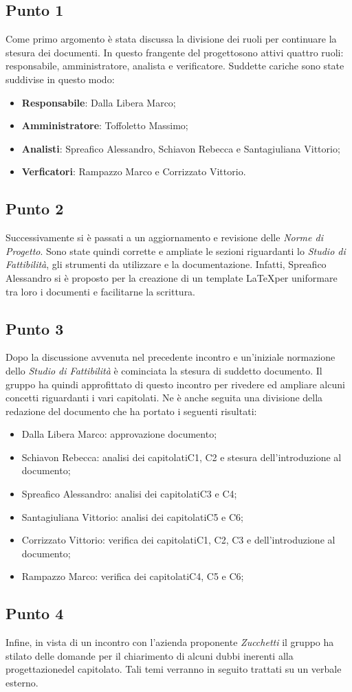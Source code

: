     \subsection{Punto 1}
        Come primo argomento è stata discussa la divisione dei ruoli per continuare la stesura dei documenti. In questo frangente del progetto\glosp sono attivi quattro ruoli: responsabile, amministratore, analista e verificatore. Suddette cariche sono state suddivise in questo modo:
        \begin{itemize}
            \item \textbf{Responsabile}: Dalla Libera Marco;
            \item \textbf{Amministratore}: Toffoletto Massimo;
            \item \textbf{Analisti}: Spreafico Alessandro, Schiavon Rebecca e Santagiuliana Vittorio;
            \item \textbf{Verficatori}: Rampazzo Marco e Corrizzato Vittorio. 
        \end{itemize}
    \subsection{Punto 2}
        Successivamente si è passati a un aggiornamento e revisione delle \textit{Norme di Progetto}. Sono state quindi corrette e ampliate le sezioni riguardanti lo \textit{Studio di Fattibilità}, gli strumenti da utilizzare e la documentazione. Infatti, Spreafico Alessandro si è proposto per la creazione di un template \LaTeX per uniformare tra loro i documenti e facilitarne la scrittura.
    \subsection{Punto 3}
        Dopo la discussione avvenuta nel precedente incontro e un'iniziale normazione dello \textit{Studio di Fattibilità} è cominciata la stesura di suddetto documento. Il gruppo ha quindi approfittato di questo incontro per rivedere ed ampliare alcuni concetti riguardanti i vari capitolati\glo. Ne è anche seguita una divisione della redazione del documento che ha portato i seguenti risultati:
        \begin{itemize}
            \item Dalla Libera Marco: approvazione documento;
            \item Schiavon Rebecca: analisi dei capitolati\glosp C1, C2 e stesura dell'introduzione al documento;
            \item Spreafico Alessandro: analisi dei capitolati\glosp C3 e C4;
            \item Santagiuliana Vittorio: analisi dei capitolati\glosp C5 e C6;
            \item Corrizzato Vittorio: verifica dei capitolati\glosp C1, C2, C3 e dell'introduzione al documento;
            \item Rampazzo Marco: verifica dei capitolati\glosp C4, C5 e C6;
        \end{itemize}
    \subsection{Punto 4}
        Infine, in vista di un incontro con l'azienda proponente \textit{Zucchetti} il gruppo ha stilato delle domande per il chiarimento di alcuni dubbi inerenti alla progettazione\glosp del capitolato\glo. Tali temi verranno in seguito trattati su un verbale esterno.